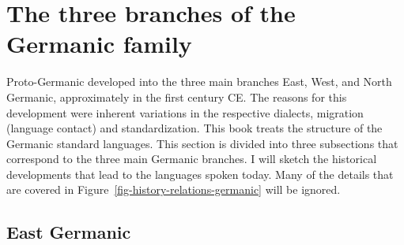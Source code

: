 




\section{The three branches of the Germanic family}

Proto-Germanic developed into the three main branches East, West, and North Germanic, approximately in
the first century CE. The reasons for this development were inherent variations in the respective
dialects, migration (language contact) and standardization. This book treats the structure of the
Germanic standard languages. This section is divided into three subsections that correspond to the
three main Germanic branches. I will sketch the historical developments that lead to the
languages spoken today. Many of the details that are covered in Figure~\ref{fig-history-relations-germanic} will be ignored.



\subsection{East Germanic}


